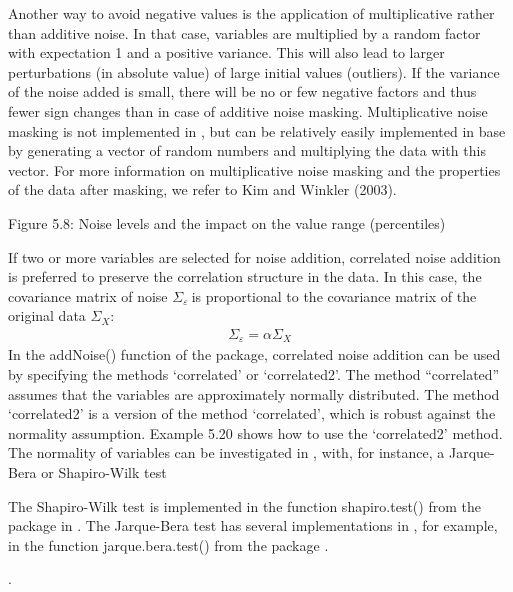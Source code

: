\documentclass[letterpaper,10pt,english]{sphinxmanual}
\begin{document}
Another way to avoid negative values is the application of
multiplicative rather than additive noise. In that case, variables are
multiplied by a random factor with expectation 1 and a positive
variance. This will also lead to larger perturbations (in absolute
value) of large initial values (outliers). If the variance of the noise
added is small, there will be no or few negative factors and thus fewer
sign changes than in case of additive noise masking. Multiplicative
noise masking is not implemented in , but can be relatively
easily implemented in base  by generating a vector of random numbers
and multiplying the data with this vector. For more information on
multiplicative noise masking and the properties of the data after
masking, we refer to Kim and Winkler (2003).

\noindent{}

Figure 5.8: Noise levels and the impact on the value range (percentiles)

If two or more variables are selected for noise addition, correlated
noise addition is preferred to preserve the correlation structure in the
data. In this case, the covariance matrix of noise
\(\Sigma_{\varepsilon}\ \)is proportional to the covariance matrix
of the original data \(\Sigma_{X}:\)
\begin{equation*}
\begin{split}\Sigma_{\varepsilon} = \alpha \Sigma_{X}\end{split}
\end{equation*}
In the addNoise() function of the  package, correlated noise
addition can be used by specifying the methods ‘correlated’ or
‘correlated2’. The method “correlated” assumes that the variables are
approximately normally distributed. The method ‘correlated2’ is a
version of the method ‘correlated’, which is robust against the
normality assumption. Example 5.20 shows how to use the ‘correlated2’
method. The normality of variables can be investigated in , with, for
instance, a Jarque-Bera or Shapiro-Wilk test %
\begin{footnote}[20]\sphinxAtStartFootnote
The Shapiro-Wilk test is implemented in the function shapiro.test()
from the package  in . The Jarque-Bera test has several
implementations in , for example, in the function
jarque.bera.test() from the package .
%
\end{footnote}.
\end{document}
